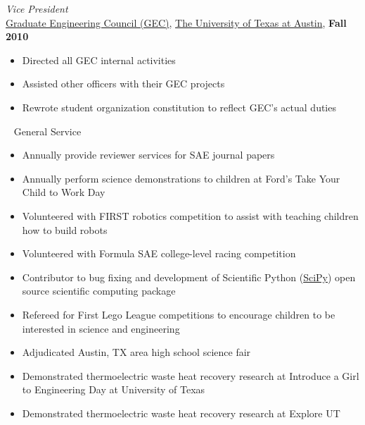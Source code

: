 \documentclass[centered]{res}
\begin{document}
\begin{resume}
\textit{Vice President} \\
\href{http://sites.google.com/site/utexasgecouncil/}{Graduate Engineering Council (GEC)},
\href{http://www.utexas.edu}{The University of Texas at Austin},
  \hfill \textbf{Fall 2010}
  \begin{itemize} \itemsep -2pt %
  \item Directed all GEC internal activities
  \item Assisted other officers with their GEC projects
  \item Rewrote student organization constitution to reflect GEC's actual duties
  \end{itemize}~
%
General Service
\begin{itemize} \itemsep -2pt %
\item Annually provide reviewer services for SAE journal papers
\item Annually perform science demonstrations to children at Ford's
  Take Your Child to Work Day
\item Volunteered with FIRST robotics competition to assist with
  teaching children how to build robots
\item Volunteered with Formula SAE college-level racing competition
\item Contributor to bug fixing and development of Scientific Python
  (\href{http://www.scipy.org/}{SciPy}) open source scientific
  computing package
\item Refereed for First Lego League competitions to encourage
  children to be interested in science and engineering
\item Adjudicated Austin, TX area high school science fair
\item Demonstrated thermoelectric waste heat recovery research at
  Introduce a Girl to Engineering Day at University of Texas
\item Demonstrated thermoelectric waste heat recovery research at
  Explore UT 
\end{itemize}


\end{resume}
\end{document}

